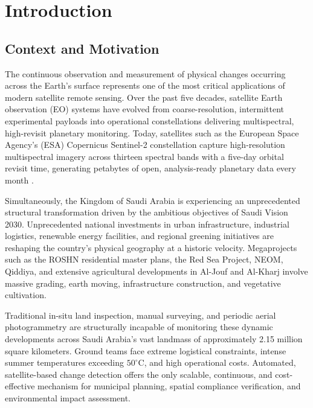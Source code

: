 \chapter{Introduction}
\label{ch:introduction}

\section{Context and Motivation}
\label{sec:intro_context}
The continuous observation and measurement of physical changes occurring across the Earth's surface represents one of the most critical applications of modern satellite remote sensing. Over the past five decades, satellite Earth observation (EO) systems have evolved from coarse-resolution, intermittent experimental payloads into operational constellations delivering multispectral, high-revisit planetary monitoring. Today, satellites such as the European Space Agency's (ESA) Copernicus Sentinel-2 constellation capture high-resolution multispectral imagery across thirteen spectral bands with a five-day orbital revisit time, generating petabytes of open, analysis-ready planetary data every month \citep{drusch2012sentinel2}.

Simultaneously, the Kingdom of Saudi Arabia is experiencing an unprecedented structural transformation driven by the ambitious objectives of Saudi Vision 2030. Unprecedented national investments in urban infrastructure, industrial logistics, renewable energy facilities, and regional greening initiatives are reshaping the country's physical geography at a historic velocity. Megaprojects such as the ROSHN residential master plans, the Red Sea Project, NEOM, Qiddiya, and extensive agricultural developments in Al-Jouf and Al-Kharj involve massive grading, earth moving, infrastructure construction, and vegetative cultivation. 

Traditional in-situ land inspection, manual surveying, and periodic aerial photogrammetry are structurally incapable of monitoring these dynamic developments across Saudi Arabia's vast landmass of approximately 2.15 million square kilometers. Ground teams face extreme logistical constraints, intense summer temperatures exceeding $50^\circ\text{C}$, and high operational costs. Automated, satellite-based change detection offers the only scalable, continuous, and cost-effective mechanism for municipal planning, spatial compliance verification, and environmental impact assessment.

